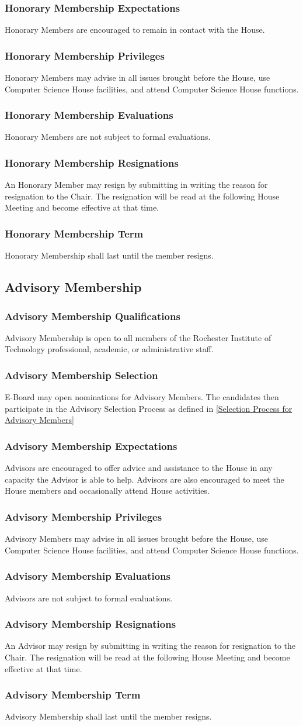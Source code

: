 \documentclass{article}
\newcommand{\asection}[1]{\subsection{#1} \label{#1}}
\newcommand{\asubsection}[1]{\subsubsection{#1} \label{#1}}
\begin{document}
\asubsection{Honorary Membership Expectations}
Honorary Members are encouraged to remain in contact with the House.

\asubsection{Honorary Membership Privileges}
Honorary Members may advise in all issues brought before the House, use Computer Science House facilities, and attend Computer Science House functions.

\asubsection{Honorary Membership Evaluations}
Honorary Members are not subject to formal evaluations.

\asubsection{Honorary Membership Resignations}
An Honorary Member may resign by submitting in writing the reason for resignation to the Chair.
The resignation will be read at the following House Meeting and become effective at that time.

\asubsection{Honorary Membership Term}
Honorary Membership shall last until the member resigns.

\asection{Advisory Membership}

\asubsection{Advisory Membership Qualifications}
Advisory Membership is open to all members of the Rochester Institute of Technology professional, academic, or administrative staff.

\asubsection{Advisory Membership Selection}
E-Board may open nominations for Advisory Members.
The candidates then participate in the Advisory Selection Process as defined in \ref{Selection Process for Advisory Members}

\asubsection{Advisory Membership Expectations}
Advisors are encouraged to offer advice and assistance to the House in any capacity the Advisor is able to help.
Advisors are also encouraged to meet the House members and occasionally attend House activities.

\asubsection{Advisory Membership Privileges}
Advisory Members may advise in all issues brought before the House, use Computer Science House facilities, and attend Computer Science House functions.

\asubsection{Advisory Membership Evaluations}
Advisors are not subject to formal evaluations.

\asubsection{Advisory Membership Resignations}
An Advisor may resign by submitting in writing the reason for resignation to the Chair.
The resignation will be read at the following House Meeting and become effective at that time.

\asubsection{Advisory Membership Term}
Advisory Membership shall last until the member resigns.
\end{document}
